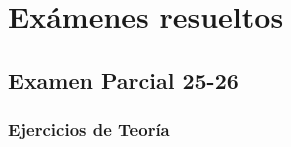 \chapter*{Exámenes resueltos}
\setcounter{chapter}{1}
\setcounter{problemacontador}{0}

\section{Examen Parcial 25-26}
\subsection{Ejercicios de Teoría}
